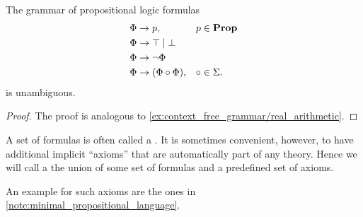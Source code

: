 \begin{proposition}\label{thm:propositional_formulas_are_unambiguous}
  The grammar of propositional logic formulas
  \begin{displaymath}
    \begin{aligned}
      &\Phi \to p,                 &&p \in \operatorname{\mathbf{Prop}} \\
      &\Phi \to \top \;|\; \bot    && \\
      &\Phi \to \neg \Phi          && \\
      &\Phi \to (\Phi \circ \Phi), &&\circ \in \Sigma.
    \end{aligned}
  \end{displaymath}
  is unambiguous.
\end{proposition}
\begin{proof}
  The proof is analogous to \cref{ex:context_free_grammar/real_arithmetic}.
\end{proof}

\begin{definition}\label{def:propositional_theory}
  A set of formulas is often called a . It is sometimes convenient, however, to have additional implicit \enquote{axioms} that are automatically part of any theory. Hence we will call a  the union of some set of formulas and a predefined set of axioms.

  An example for such axioms are the ones in \cref{note:minimal_propositional_language}.
\end{definition}

